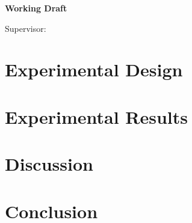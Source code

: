 \documentclass[12pt,a4paper,oneside,openany]{book}
\begin{document}
\frontmatter
\begin{titlepage}
  \centering
  \vspace*{18mm}
  {\Large\bfseries \thesistitle\par}
  \vspace{18mm}
  {\Large\bfseries Working Draft\par}
  \vspace{18mm}
  {\large \thesisauthor\par}
  \vfill
  {\large Supervisor: \thesissupervisor\par}
  \vspace{15mm}
  {\large \thesisschool\par}
  {\large \thesisuniversity\par}
  \vspace{15mm}
  {\large \thesisdate\par}
\end{titlepage}
\setcounter{page}{1}
\tableofcontents

\mainmatter





\chapter{Experimental Design}
\label{chap:design}

\chapter{Experimental Results}
\label{chap:results}
\setcounter{section}{6}
\label{sec:mechanism-results}

\chapter{Discussion}
\label{chap:discussion}

\chapter{Conclusion}
\label{chap:conclusion}

\appendix
{}
\label{app:derivation-details}
\label{app:construction}
\label{app:evidence-index}
\label{app:independence-boundary}
\label{app:reproducibility}

\backmatter


\end{document}
